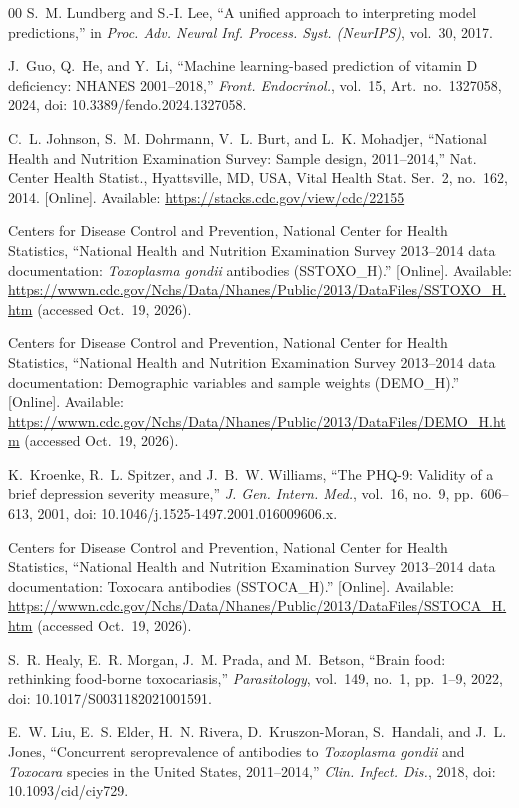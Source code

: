 \documentclass[conference]{IEEEtran}
\begin{document}
\begin{thebibliography}{00}
 S.~M. Lundberg and S.-I. Lee, ``A unified approach to interpreting model predictions,'' in \textit{Proc. Adv. Neural Inf. Process. Syst. (NeurIPS)}, vol.~30, 2017.

 J.~Guo, Q.~He, and Y.~Li, ``Machine learning-based prediction of vitamin D deficiency: NHANES 2001--2018,'' \textit{Front. Endocrinol.}, vol.~15, Art.~no.~1327058, 2024, doi: 10.3389/fendo.2024.1327058.

 C.~L. Johnson, S.~M. Dohrmann, V.~L. Burt, and L.~K. Mohadjer, ``National Health and Nutrition Examination Survey: Sample design, 2011--2014,'' Nat. Center Health Statist., Hyattsville, MD, USA, Vital Health Stat. Ser.~2, no.~162, 2014. [Online]. Available: \url{https://stacks.cdc.gov/view/cdc/22155}

 Centers for Disease Control and Prevention, National Center for Health Statistics, ``National Health and Nutrition Examination Survey 2013--2014 data documentation: \textit{Toxoplasma gondii} antibodies (SSTOXO\_H).'' [Online]. Available: \url{https://wwwn.cdc.gov/Nchs/Data/Nhanes/Public/2013/DataFiles/SSTOXO_H.htm} (accessed Oct.~19, 2026).

 Centers for Disease Control and Prevention, National Center for Health Statistics, ``National Health and Nutrition Examination Survey 2013--2014 data documentation: Demographic variables and sample weights (DEMO\_H).'' [Online]. Available: \url{https://wwwn.cdc.gov/Nchs/Data/Nhanes/Public/2013/DataFiles/DEMO_H.htm} (accessed Oct.~19, 2026).

 K.~Kroenke, R.~L. Spitzer, and J.~B.~W. Williams, ``The PHQ-9: Validity of a brief depression severity measure,'' \textit{J. Gen. Intern. Med.}, vol.~16, no.~9, pp.~606--613, 2001, doi: 10.1046/j.1525-1497.2001.016009606.x.

 Centers for Disease Control and Prevention, National Center for Health Statistics, ``National Health and Nutrition Examination Survey 2013--2014 data documentation: Toxocara antibodies (SSTOCA\_H).'' [Online]. Available: \url{https://wwwn.cdc.gov/Nchs/Data/Nhanes/Public/2013/DataFiles/SSTOCA_H.htm} (accessed Oct.~19, 2026).

 S.~R. Healy, E.~R. Morgan, J.~M. Prada, and M.~Betson, ``Brain food: rethinking food-borne toxocariasis,'' \textit{Parasitology}, vol.~149, no.~1, pp.~1--9, 2022, doi: 10.1017/S0031182021001591.

 E.~W. Liu, E.~S. Elder, H.~N. Rivera, D.~Kruszon-Moran, S.~Handali, and J.~L. Jones, ``Concurrent seroprevalence of antibodies to \textit{Toxoplasma gondii} and \textit{Toxocara} species in the United States, 2011--2014,'' \textit{Clin. Infect. Dis.}, 2018, doi: 10.1093/cid/ciy729.


\end{thebibliography}
\end{document}
